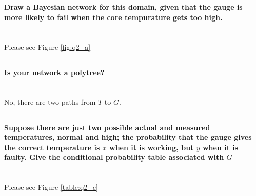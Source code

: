 \documentclass[	DIV=calc,%
				paper=a4,%
				fontsize=11pt,%
				twocolumn]{article}	 %
\begin{document}
\begin{figure}[h]
\begin{minipage}[b][\ht\measurebox][s]{0.4\textwidth}
\vfill

  \end{minipage}  

\end{figure}


\subsection{}
\paragraph{Draw a Bayesian network for this domain, given that the gauge is more likely to fail when the core tempurature gets too high.}
~\\
Please see Figure \ref{fig:q2_a}
\subsection{}
\paragraph{Is your network a polytree?}
~\\
No, there are two paths from $T$ to $G$. 
\subsection{}
\paragraph{Suppose there are just two possible actual and measured temperatures, normal and high; the probability that the gauge gives the correct temperature is $x$ when it is working, but $y$ when it is faulty. Give the conditional probability table associated with $G$}
~\\
Please see Figure \ref{table:q2_c}
\subsection{}
\end{document}
